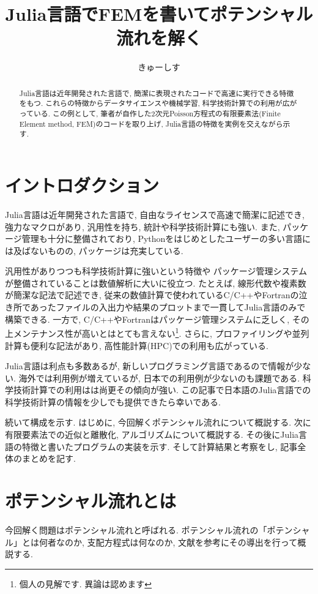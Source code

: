 \documentclass{ltjsarticle}
\begin{document}
\title{Julia言語でFEMを書いてポテンシャル流れを解く}
\author{きゅーしす}
\maketitle
\begin{abstract}
    Julia言語は近年開発された言語で, 簡潔に表現されたコードで高速に実行できる特徴をもつ. 
    これらの特徴からデータサイエンスや機械学習, 科学技術計算での利用が広がっている. 
    この例として, 筆者が自作した2次元Poisson方程式の有限要素法(Finite Element method, FEM)のコードを取り上げ, 
    Julia言語の特徴を実例を交えながら示す. 
\end{abstract}



\section{イントロダクション}
Julia言語は近年開発された言語で, 自由なライセンスで高速で簡潔に記述でき, 
強力なマクロがあり, 汎用性を持ち, 統計や科学技術計算にも強い\cite{Bezanson2012}. 
また, パッケージ管理も十分に整備されており, 
Pythonをはじめとしたユーザーの多い言語には及ばないものの, パッケージは充実している. 

汎用性がありつつも科学技術計算に強いという特徴や
パッケージ管理システムが整備されていることは数値解析に大いに役立つ.
たとえば, 線形代数や複素数が簡潔な記法で記述でき, 
従来の数値計算で使われているC/C++やFortranの泣き所であったファイルの入出力や結果のプロットまで一貫してJulia言語のみで構築できる.
一方で, C/C++やFortranはパッケージ管理システムに乏しく, 
その上メンテナンス性が高いとはとても言えない\footnote{個人の見解です. 異論は認めます}. 
さらに, プロファイリングや並列計算も便利な記法があり, 高性能計算(HPC)での利用も広がっている.

Julia言語は利点も多数あるが, 新しいプログラミング言語であるので情報が少ない. 
海外では利用例が増えているが, 日本での利用例が少ないのも課題である. 
科学技術計算での利用はは尚更その傾向が強い. 
この記事で日本語のJulia言語での科学技術計算の情報を少しでも提供できたら幸いである. 

続いて構成を示す. 
はじめに, 今回解くポテンシャル流れについて概説する. 
次に有限要素法での近似と離散化, アルゴリズムについて概説する. 
その後にJulia言語の特徴と書いたプログラムの実装を示す. 
そして計算結果と考察をし, 記事全体のまとめを記す. 

\section{ポテンシャル流れとは}
今回解く問題はポテンシャル流れと呼ばれる. 
ポテンシャル流れの「ポテンシャル」とは何者なのか, 
支配方程式は何なのか,
文献\cite{Kanbe1995}を参考にその導出を行って概説する. 
\end{document}
